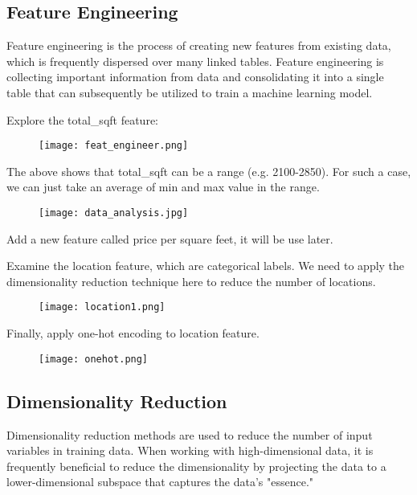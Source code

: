 \documentclass[a4paper, 12pt]{article}
\begin{document}
\subsection{Feature Engineering}
Feature engineering is the process of creating new features from existing data, which is frequently dispersed over many linked tables. Feature engineering is collecting important information from data and consolidating it into a single table that can subsequently be utilized to train a machine learning model.

Explore the total\_sqft feature:

\begin{figure}[h]
    \centering
    \texttt{[image: feat\_engineer.png]}
\end{figure}

The above shows that total\_sqft can be a range (e.g. 2100-2850). For such a case, we can just take an average of min and max value in the range. 

\begin{figure}[tbh]
    \centering
    \texttt{[image: data\_analysis.jpg]}
\end{figure}

Add a new feature called price per square feet, it will be use later.

Examine the location feature, which are categorical labels. We need to apply the dimensionality reduction technique here to reduce the number of locations.
\newpage
\begin{figure}[tbh]
    \centering
    \texttt{[image: location1.png]}
\end{figure}

Finally, apply one-hot encoding to location feature.

\begin{figure}[tbh]
    \centering
    \texttt{[image: onehot.png]}
\end{figure}

\subsection{Dimensionality Reduction}
Dimensionality reduction methods are used to reduce the number of input variables in training data. When working with high-dimensional data, it is frequently beneficial to reduce the dimensionality by projecting the data to a lower-dimensional subspace that captures the data's "essence."
\end{document}
